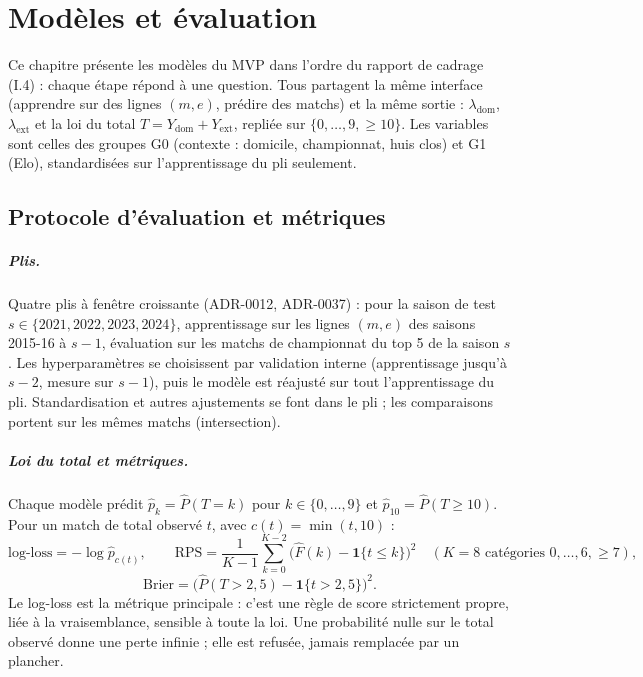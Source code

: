 
\chapter{Modèles et évaluation}
\label{chap:modeles}

Ce chapitre présente les modèles du MVP dans l'ordre du rapport de cadrage (I.4) : chaque étape
répond à une question. Tous partagent la même interface (apprendre sur des lignes \((m, e)\),
prédire des matchs) et la même sortie : \(\lambda_{\mathrm{dom}}\), \(\lambda_{\mathrm{ext}}\) et la
loi du total \(T = Y_{\mathrm{dom}} + Y_{\mathrm{ext}}\), repliée sur \(\{0, \dots, 9, \ge 10\}\).
Les variables sont celles des groupes G0 (contexte : domicile, championnat, huis clos) et G1 (Elo),
standardisées sur l'apprentissage du pli seulement.

\section{Protocole d'évaluation et métriques}
\label{sec:protocole}

\paragraph{Plis.} Quatre plis à fenêtre croissante (ADR-0012, ADR-0037) : pour la saison de test
\(s \in \{2021, 2022, 2023, 2024\}\), apprentissage sur les lignes \((m, e)\) des saisons 2015-16 à
\(s - 1\), évaluation sur les matchs de championnat du top 5 de la saison \(s\). Les hyperparamètres se
choisissent par validation interne (apprentissage jusqu'à \(s - 2\), mesure sur \(s - 1\)), puis le
modèle est réajusté sur tout l'apprentissage du pli. Standardisation et autres ajustements se font
dans le pli ; les comparaisons portent sur les mêmes matchs (intersection).

\paragraph{Loi du total et métriques.} Chaque modèle prédit
\(\hat p_k = \hat P(T = k)\) pour \(k \in \{0, \dots, 9\}\) et \(\hat p_{10} = \hat P(T \ge 10)\). Pour un
match de total observé \(t\), avec \(c(t) = \min(t, 10)\) :
\[
  \text{log-loss} = -\log \hat p_{c(t)},
  \qquad
  \text{RPS} = \frac{1}{K - 1}\sum_{k=0}^{K-2}\Big(\hat F(k) - \mathbf{1}\{t \le k\}\Big)^2
  \quad (K = 8 \text{ catégories } 0, \dots, 6, \ge 7),
\]
\[
  \text{Brier} = \big(\hat P(T > 2{,}5) - \mathbf{1}\{t > 2{,}5\}\big)^2 .
\]
Le log-loss est la métrique principale : c'est une règle de score strictement propre, liée à la
vraisemblance, sensible à toute la loi. Une probabilité nulle sur le total observé donne une perte
infinie ; elle est refusée, jamais remplacée par un plancher.

